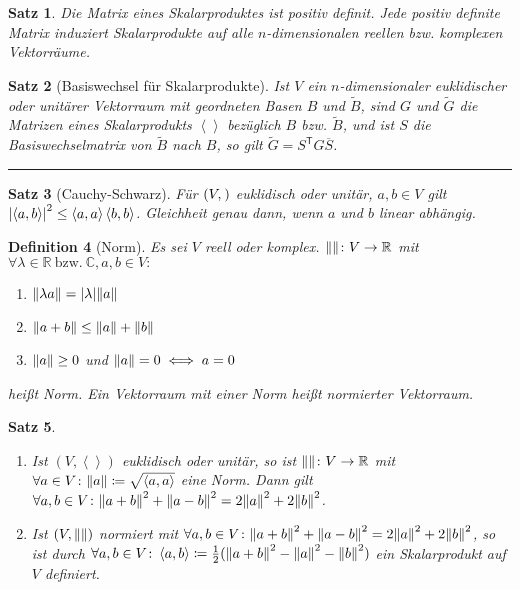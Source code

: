 \documentclass[a4paper]{article}
\newcounter{Sec}
\theoremstyle{marginbreak}
\newtheorem{definition}{Definition}[Sec]
\newtheorem{satz}[definition]{Satz}
\newcommand{\sep}{%
	\rule{\textwidth}{0.3pt}%
	\stepcounter{Sec}%
	}
\newcommand\conj{\overline}
\newcommand\scp[1]{\left\langle#1\right\rangle}
\newcommand\transpose[1]{#1^{\mathsf{T}}}
\begin{document}
	\begin{satz}
		Die Matrix eines Skalarproduktes ist positiv definit. Jede positiv definite
		Matrix induziert Skalarprodukte auf alle $n$-dimensionalen reellen bzw. komplexen
		Vektorräume.
	\end{satz}
	\begin{satz}[Basiswechsel für Skalarprodukte]
		Ist $V$ ein $n$-dimensionaler euklidischer oder unitärer Vektorraum mit
		geordneten Basen $B$ und $\tilde{B}$, sind $G$ und $\tilde{G}$ die Matrizen
		eines Skalarprodukts $\scp{}$ bezüglich $B$ bzw. $\tilde{B}$, und ist $S$ die Basiswechselmatrix
		von $\tilde{B}$ nach $B$, so gilt $\tilde{G} = \transpose{S}G\conj{S}$.
	\end{satz}
	\sep
	\begin{satz}[Cauchy-Schwarz]
		Für $(V, \sp{})$ euklidisch oder unitär, $a, b\in V$ gilt $\abs{\scp{a, b}}^2\leq\scp{a, a}\scp{b, b}$.
		Gleichheit genau dann, wenn $a$ und $b$ linear abhängig.
	\end{satz}
	\begin{definition}[Norm]
		Es sei $V$ reell oder komplex. $\norm{}\colon V\to\mathbb{R}$ mit
		$\forall\lambda\in\mathbb{R}\ \text{bzw.}\ \mathbb{C}, a, b\in V\colon$
		\begin{enumerate}[label=(\alph*)]
			\item $\norm{\lambda a} = \abs{\lambda}\norm{a}$
			\item $\norm{a + b} \leq \norm{a} + \norm{b}$
			\item $\norm{a} \geq 0$ und $\norm{a} = 0\iff a = 0$
		\end{enumerate}
		heißt Norm. Ein Vektorraum mit einer Norm heißt normierter Vektorraum.
	\end{definition}
	\begin{satz}
		\begin{enumerate}[label=(\alph*)]
			\item Ist $(V, \scp{})$ euklidisch oder unitär, so ist $\norm{}\colon V\to\mathbb{R}$ mit
				$\forall a\in V\colon\norm{a}\coloneqq\sqrt{\scp{a, a}}$ eine Norm. Dann gilt
				$\forall a, b\in V\colon \norm{a + b}^2 + \norm{a - b}^2 = 2\norm{a}^2 + 2\norm{b}^2$.
			\item Ist $(V, \norm{})$ normiert mit
				$\forall a, b\in V\colon \norm{a + b}^2 + \norm{a - b}^2 = 2\norm{a}^2 + 2\norm{b}^2$,
				so ist durch $\forall a, b\in V\colon \scp{a, b}\coloneqq \frac{1}{2}(\norm{a + b}^2 - \norm{a}^2 - \norm{b}^2)$
				ein Skalarprodukt auf $V$ definiert.
		\end{enumerate}
	\end{satz}
\end{document}
